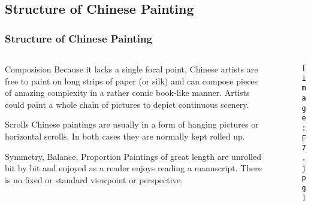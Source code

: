\documentclass[pdflatex,compress,8pt,
	xcolor={dvipsnames,dvipsnames,svgnames,x11names,table},
	hyperref={	
	breaklinks = true, 
	pdfauthor={Lemenkova Polina}, 
	pdfsubject={Preentation}, 
	pdfcreator={Lemenkova Polina}, 
	pdfproducer={Lemenkova Polina}, 
	colorlinks=true,
	linkcolor=NavyBlue, 
	citecolor=NavyBlue, 
	urlcolor = NavyBlue, 
	breaklinks = true}]{beamer}
\begin{document}
\subsection{Structure of Chinese Painting}
\begin{frame}\frametitle{Structure of Chinese Painting}

	\begin{minipage}[0.4\textheight]{\textwidth}
		\begin{columns}[T]
			\begin{column}{0.5\textwidth}
	\small{
	\begin{alertblock}{Composision}
	Because it lacks a single focal point, Chinese artists are free to paint on long strips of paper (or silk) and can compose pieces of amazing complexity in a rather comic book-like manner. Artists could paint a whole chain of pictures to depict continuous scenery.
	\end{alertblock}
	
	\begin{block}{Scrolls}
	Chinese paintings are usually in a form of hanging pictures or horizontal scrolls. In both cases they are normally kept rolled up.
	\end{block}

	\begin{alertblock}{Symmetry, Balance, Proportion}
	Paintings of great length are unrolled bit by bit and enjoyed as a reader enjoys reading a manuscript. There is no fixed or standard viewpoint or perspective. 
	\end{alertblock}
	}	
		\end{column}
			\begin{column}{0.5\textwidth}
\begin{figure}[H]
	\centering
		\texttt{[image: F7.jpg]}
\end{figure}
			\end{column}
		\end{columns}
	\end{minipage}
	
\end{frame}
\end{document}
